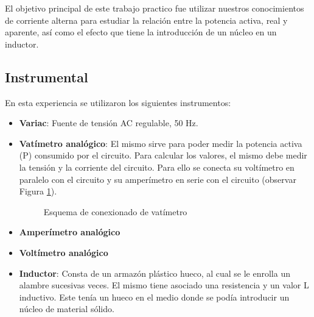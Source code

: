 \documentclass{article}
\begin{document}
        El objetivo principal de este trabajo practico fue utilizar nuestros conocimientos de corriente alterna para estudiar la relación entre la potencia activa, real y aparente, así como el efecto que tiene la introducción de un núcleo en un inductor.

        \subsection{Instrumental}

        En esta experiencia se utilizaron los siguientes instrumentos:

        \begin{itemize}
            \renewcommand{\labelitemi}{$\bullet$}
            \item {\bfseries Variac}: Fuente de tensión AC regulable, 50 Hz.
            \item {\bfseries Vatímetro analógico}: El mismo sirve para poder medir la potencia activa (P) consumido por el circuito.
                    Para calcular los valores, el mismo debe medir la tensión y la corriente del circuito. Para ello se conecta su voltímetro en paralelo con el circuito y su amperímetro en serie con el circuito (observar Figura \ref{fig:vatimetro}). \par

                    \begin{figure}[h!] %
                        \centering
                        \caption{Esquema de conexionado de vatímetro}
                        \label{fig:vatimetro}
                    \end{figure}
            \item {\bfseries Amperímetro analógico}
            \item {\bfseries Voltímetro analógico}
            \item {\bfseries Inductor}: Consta de un armazón plástico hueco, al cual se le enrolla un alambre sucesivas veces. El mismo tiene asociado una resistencia y un valor L inductivo. 
                Este tenía un hueco en el medio donde se podía introducir un núcleo de material sólido. 
        \end{itemize}
        
\end{document}
